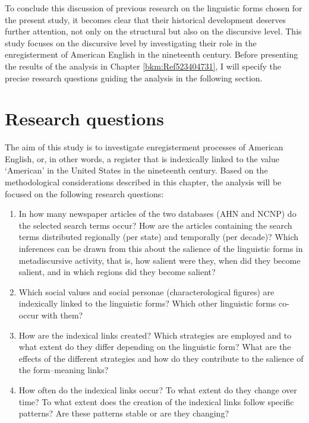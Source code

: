 To conclude this discussion of previous research on the linguistic forms chosen for the present study, it becomes clear that their historical development deserves further attention, not only on the structural but also on the discursive level. This study focuses on the discursive level by investigating their role in the enregisterment of American English in the nineteenth century. Before presenting the results of the analysis in Chapter \ref{bkm:Ref523404731}, I will specify the precise research questions guiding the analysis in the following section.

\section{Research questions}
\label{bkm:Ref523382450}\hypertarget{Toc63021231}{}\label{bkm:Ref523762184}
The aim of this study is to investigate enregisterment processes of American English, or, in other words, a register that is indexically linked to the value ‘American’ in the United States in the nineteenth century. Based on the methodological considerations described in this chapter, the analysis will be focused on the following research questions:


\begin{enumerate}
\item
In how many newspaper articles of the two databases (AHN and NCNP) do the selected search terms occur? How are the articles containing the search terms distributed regionally (per state) and temporally (per decade)? Which inferences can be drawn from this about the salience of the linguistic forms in metadiscursive activity, that is, how salient were they, when did they become salient, and in which regions did they become salient?
\item
Which social values and social personae (characterological figures) are indexically linked to the linguistic forms? Which other linguistic forms co-occur with them?
\item
How are the indexical links created? Which strategies are employed and to what extent do they differ depending on the linguistic form? What are the effects of the different strategies and how do they contribute to the salience of the form–meaning links?
\item
How often do the indexical links occur? To what extent do they change over time? To what extent does the creation of the indexical links follow specific patterns? Are these patterns stable or are they changing?
\end{enumerate}

